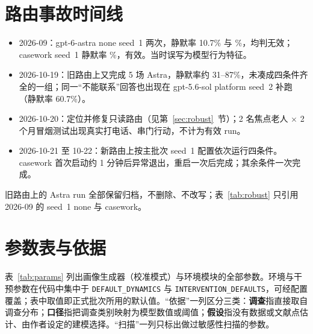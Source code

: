 \documentclass[10.5pt,twocolumn]{ctexart}
\begin{document}
\section{路由事故时间线}\label{app:router}
\begin{itemize}
\item 2026-09：gpt-6-astra none seed~1 两次，静默率 10.7\% 与 \ArOldSilNone\%，均判无效；casework seed~1 静默率 \ArOldSilCw\%，有效。当时误写为模型行为特征。
\item 2026-10-19：旧路由上又完成 5 场 Astra，静默率约 31--87\%，未凑成四条件齐全的一组；同一``不能联系''回答也出现在 gpt-5.6-sol platform seed~2 补跑（静默率 60.7\%）。
\item 2026-10-20：定位并修复只读路由（见第~\ref{sec:robust}~节）；2 名焦点老人 $\times$ 2 个月冒烟测试出现真实打电话、串门行动，不计为有效 run。
\item 2026-10-21 至 10-22：新路由上按主批次 seed~1 配置依次运行四条件。casework 首次启动约 1 分钟后异常退出，重启一次后完成；其余条件一次完成。
\end{itemize}
旧路由上的 Astra run 全部保留归档，不删除、不改写；表~\ref{tab:robust} 只引用 2026-09 的 seed~1 none 与 casework。

\section{参数表与依据}\label{app:params}
表~\ref{tab:params} 列出画像生成器（校准模式）与环境模块的全部参数。环境与干预参数在代码中集中于 \texttt{DEFAULT\_DYNAMICS} 与 \texttt{INTERVENTION\_DEFAULTS}，可经配置覆盖；表中取值即正式批次所用的默认值。``依据''一列区分三类：\textbf{调查}指直接取自调查分布；\textbf{口径}指把调查类别映射为模型数值或阈值；\textbf{假设}指没有数据或文献点估计、由作者设定的建模选择。``扫描''一列只标出做过敏感性扫描的参数。
\end{document}
